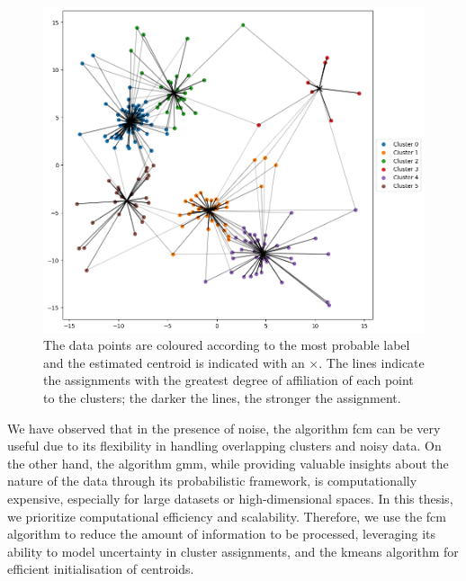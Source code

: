 \begin{figure}[H]
	\centering
	\includegraphics[width=0.9\linewidth]{Figures/dati_fcm.png}
	\caption[Example of \gls{fcm} clustering]{The data points are coloured according to the most probable label and the estimated centroid is indicated with an $\times$. The lines indicate the assignments with the greatest degree of affiliation of each point to the clusters; the darker the lines, the stronger the assignment.}
	\label{fig:data_fcm}
\end{figure}

\bigskip
\begin{modified}
We have observed that in the presence of noise, the algorithm \gls{fcm} can be very useful due to its flexibility in handling overlapping clusters and noisy data. On the other hand, the algorithm \gls{gmm}, while providing valuable insights about the nature of the data through its probabilistic framework, is computationally expensive, especially for large datasets or high-dimensional spaces. In this thesis, we prioritize computational efficiency and scalability. Therefore, we use the \gls{fcm} algorithm to reduce the amount of information to be processed, leveraging its ability to model uncertainty in cluster assignments, and the \gls{kmeans} algorithm for efficient initialisation of centroids.
\end{modified}
